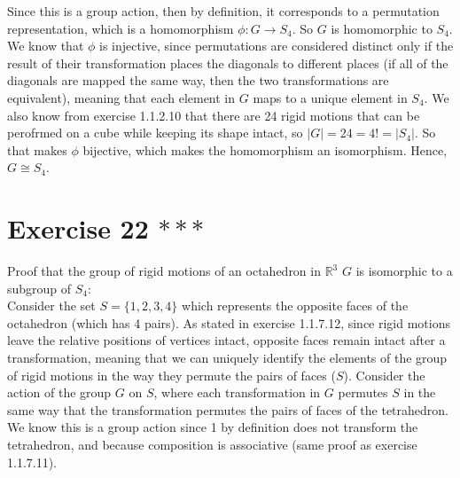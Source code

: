 \documentclass{article}
\newcommand{\R}{\mathbb{R}}
\begin{document}
    Since this is a group action, then by definition,
    it corresponds to a permutation representation,
    which is a homomorphism $\phi: G \to S_4$.
    So $G$ is homomorphic to $S_4$. \\
    We know that $\phi$ is injective, since permutations are considered 
    distinct only if the result of their transformation places the
    diagonals to different places (if all of the diagonals are mapped
    the same way, then the two transformations are equivalent),
    meaning that each element in $G$ maps to a unique element in $S_4$.
    We also know from exercise 1.1.2.10 that there are 24 rigid
    motions that can be perofrmed on a cube while keeping its shape intact,
    so $|G| = 24 = 4! = |S_4|$.
    So that makes $\phi$ bijective, which makes the homomorphism
    an isomorphism.
    Hence, $G \cong S_4$.

    
    \section*{Exercise 22 $***$}
    Proof that the group of rigid motions of an octahedron in $\R^3$ $G$
    is isomorphic to a subgroup of $S_4$: \\
    Consider the set $S = \{1, 2, 3 ,4\}$ which represents the opposite
    faces of the octahedron (which has 4 pairs).
    As stated in exercise 1.1.7.12,
    since rigid motions leave the relative positions of vertices intact,
    opposite faces remain intact after a transformation,
    meaning that we can uniquely identify the elements of the group of
    rigid motions in the way they permute the pairs of faces ($S$).
    Consider the action of the group $G$ on $S$,
    where each transformation in $G$ permutes $S$ in the same way that
    the transformation permutes the pairs of faces of the tetrahedron.
    We know this is a group action since 1 by definition does not transform 
    the tetrahedron,
    and because composition is associative
    (same proof as exercise 1.1.7.11). \\
\end{document}
